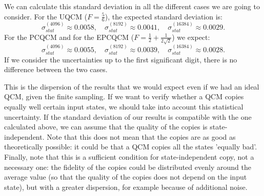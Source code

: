 We can calculate this standard deviation in all the different cases we are going to consider.
For the UQCM ($F=\frac{5}{6}$), the expected standard deviation is:
\begin{equation}
    \sigma_{stat}^{(4096)}\approx 0.0058, \quad \sigma_{stat}^{(8192)}\approx 0.0041, \quad \sigma_{stat}^{(16384)}\approx 0.0029.
    \label{eqn:dispersion_uqcm}
\end{equation}
For the PCQCM and for the EPCQCM ($F=\frac{1}{2}+\frac{1}{2\sqrt{2}}$) we expect:
\begin{equation}
    \sigma_{stat}^{(4096)}\approx 0.0055, \quad \sigma_{stat}^{(8192)}\approx 0.0039, \quad \sigma_{stat}^{(16384)}\approx 0.0028.
    \label{eqn:dispersion_pcqcm}
\end{equation}
If we consider the uncertainties up to the first significant digit, there is no difference between the two cases.

This is the dispersion of the results that we would expect even if we had an ideal QCM, given the finite sampling.
If we want to verify whether a QCM copies equally well certain input states, we should take into account this statistical uncertainty.
If the standard deviation of our results is compatible with the one calculated above, we can assume that the quality of the copies is state-independent.
Note that this does not mean that the copies are as good as theoretically possible: it could be that a QCM copies all the states 'equally bad'.  
Finally, note that this is a sufficient condition for state-independent copy, not a necessary one: the fidelity of the copies could be distributed evenly around the average value (so that the quality of the copies does not depend on the input state), 
but with a greater dispersion, for example because of additional noise.

